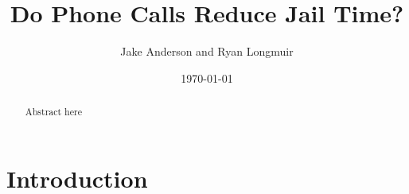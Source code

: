 \documentclass[12pt, a4paper]{article}
\title{Do Phone Calls Reduce Jail Time?}
\author{Jake Anderson and Ryan Longmuir}
\date{\today}
\begin{document}
\maketitle

\begin{abstract}
Abstract here
\end{abstract}

\newpage
\section{Introduction}


\end{document}
